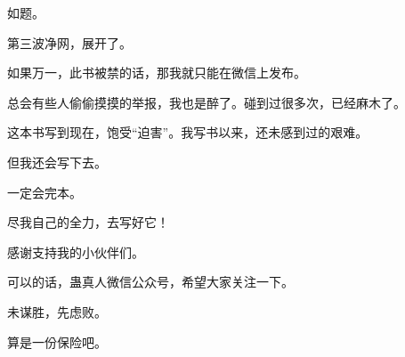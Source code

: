 \begin{this_body} %

如题。

第三波净网，展开了。

如果万一，此书被禁的话，那我就只能在微信上发布。

总会有些人偷偷摸摸的举报，我也是醉了。碰到过很多次，已经麻木了。

这本书写到现在，饱受“迫害”。我写书以来，还未感到过的艰难。

但我还会写下去。

一定会完本。

尽我自己的全力，去写好它！

感谢支持我的小伙伴们。

可以的话，蛊真人微信公众号，希望大家关注一下。

未谋胜，先虑败。

算是一份保险吧。

\end{this_body}

